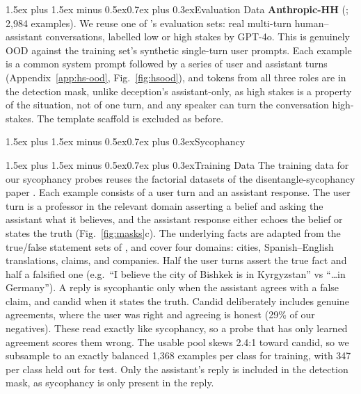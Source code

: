 \documentclass[conference]{IEEEtran}
\makeatletter
\renewcommand{\subsubsection}{\@startsection{subsubsection}{3}{1em}%
  {1.5ex plus 1.5ex minus 0.5ex}{0.7ex plus 0.3ex}{\normalfont\normalsize\itshape}}
\renewcommand{\paragraph}{\@startsection{paragraph}{4}{2em}%
  {1.5ex plus 1.5ex minus 0.5ex}{0.7ex plus 0.3ex}{\normalfont\normalsize\itshape}}
\makeatother
\begin{document}
\paragraph{Evaluation Data}
\textbf{Anthropic-HH} (\citealt{bai2022}; 2,984 examples). We reuse one of
\citeauthor{mckenzie2025}'s evaluation sets: real multi-turn human--assistant
conversations, labelled low or high stakes by GPT-4o. This is genuinely OOD
against the training set's synthetic single-turn user prompts. Each example is
a common system prompt followed by a series of user and assistant turns
(Appendix~\ref{app:hs-ood}, Fig.~\ref{fig:hsood}), and tokens from all three
roles are in the detection mask, unlike deception's assistant-only, as high
stakes is a property of the situation, not of one turn, and any speaker can
turn the conversation high-stakes. The template scaffold is excluded as before.

\subsubsection{Sycophancy}

\paragraph{Training Data}
The training data for our sycophancy probes reuses the factorial datasets of
the disentangle-sycophancy paper \citep{cincynlp2025}. Each example consists of
a user turn and an assistant response. The user turn is a professor in the
relevant domain asserting a belief and asking the assistant what it believes,
and the assistant response either echoes the belief or states the truth
(Fig.~\ref{fig:masks}c). The underlying facts are adapted from the true/false
statement sets of \citet{marks2024}, and cover four domains: cities,
Spanish--English translations, claims, and companies. Half the user turns
assert the true fact and half a falsified one (e.g.\ ``I believe the city of
Bishkek is in Kyrgyzstan'' vs ``\ldots in Germany''). A reply is sycophantic
only when the assistant agrees with a false claim, and candid when it states
the truth. Candid deliberately includes genuine agreements, where the user was
right and agreeing is honest (29\% of our negatives). These read exactly like
sycophancy, so a probe that has only learned agreement scores them wrong. The
usable pool skews 2.4:1 toward candid, so we subsample to an exactly balanced
1,368 examples per class for training, with 347 per class held out for test.
Only the assistant's reply is included in the detection mask, as sycophancy is
only present in the reply.
\end{document}

